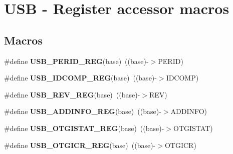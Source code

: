 \hypertarget{group___u_s_b___register___accessor___macros}{}\section{U\+SB -\/ Register accessor macros}
\label{group___u_s_b___register___accessor___macros}
\subsection*{Macros}
\begin{DoxyCompactItemize}
\item 
\mbox{\label{group___u_s_b___register___accessor___macros_ga61c99097ee83a271dafdfb6b04980cc8}} 
\#define {\bfseries U\+S\+B\+\_\+\+P\+E\+R\+I\+D\+\_\+\+R\+EG}(base)~((base)-\/$>$P\+E\+R\+ID)
\item 
\mbox{\label{group___u_s_b___register___accessor___macros_ga74152969f2622631ccd8ceccf72c4e7e}} 
\#define {\bfseries U\+S\+B\+\_\+\+I\+D\+C\+O\+M\+P\+\_\+\+R\+EG}(base)~((base)-\/$>$I\+D\+C\+O\+MP)
\item 
\mbox{\label{group___u_s_b___register___accessor___macros_gafdbb3ea723c0bb8a1f5bb42e84fbdfe5}} 
\#define {\bfseries U\+S\+B\+\_\+\+R\+E\+V\+\_\+\+R\+EG}(base)~((base)-\/$>$R\+EV)
\item 
\mbox{\label{group___u_s_b___register___accessor___macros_ga618d42fa57e39a224a30a72f347573fb}} 
\#define {\bfseries U\+S\+B\+\_\+\+A\+D\+D\+I\+N\+F\+O\+\_\+\+R\+EG}(base)~((base)-\/$>$A\+D\+D\+I\+N\+FO)
\item 
\mbox{\label{group___u_s_b___register___accessor___macros_ga1b290906273a7a293d262a00c3425319}} 
\#define {\bfseries U\+S\+B\+\_\+\+O\+T\+G\+I\+S\+T\+A\+T\+\_\+\+R\+EG}(base)~((base)-\/$>$O\+T\+G\+I\+S\+T\+AT)
\item 
\mbox{\label{group___u_s_b___register___accessor___macros_ga96be0cb820aa0542e4c046f814b61636}} 
\#define {\bfseries U\+S\+B\+\_\+\+O\+T\+G\+I\+C\+R\+\_\+\+R\+EG}(base)~((base)-\/$>$O\+T\+G\+I\+CR)

\end{DoxyCompactItemize}

